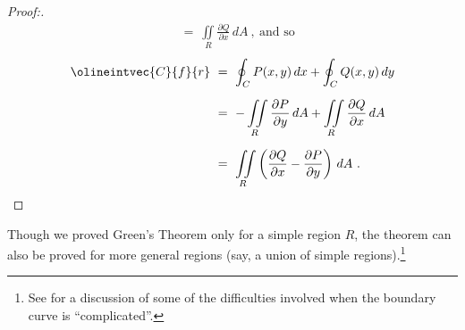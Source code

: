 \begin{proof}[Proof:]
\begin{align*}
   &=~ \iint\limits_{R} \frac{\partial Q}{\partial x}\,dA ~,~\text{and so}
 \end{align*}
    \begin{align*}
  \olineintvec{C}{f}{r} ~&=~ \oint_C P(x,y)\,dx + \oint_C Q(x,y)\,dy\\[6pt]
   &=~ -\iint\limits_{R} \frac{\partial P}{\partial y}\,dA + \iint\limits_{R} \frac{\partial Q}{\partial x}\,dA\\[6pt]
   &=~ \iint\limits_{R} \left( \frac{\partial Q}{\partial x} - \frac{\partial P}{\partial y} \right)\,dA ~.
 \end{align*}
\end{proof}\vspace{-3mm}

Though we proved Green's Theorem only for a simple region $R$, the theorem can also be proved for more general
regions (say, a union of simple regions).\footnote{See \cite[\S\,15.31]{tm} for a discussion of
some of the difficulties involved when the boundary curve is ``complicated''.}


